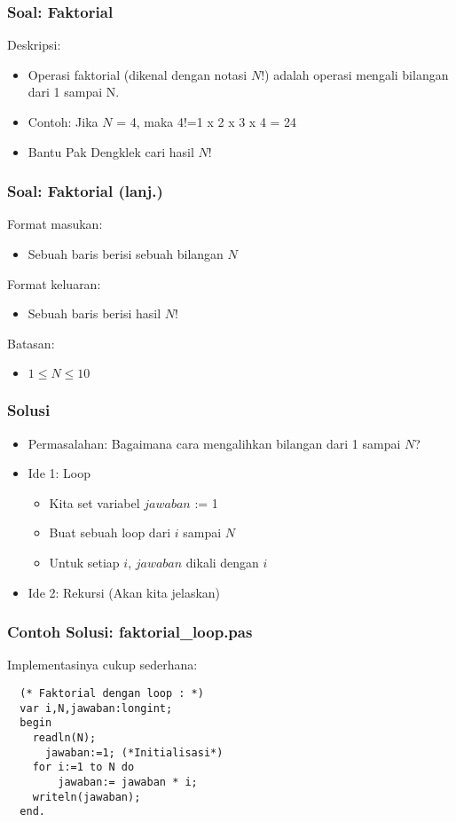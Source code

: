 \begin{frame}
\frametitle{Soal: Faktorial}
Deskripsi:
\begin{itemize}
  \item Operasi faktorial (dikenal dengan notasi $N$!) adalah operasi mengali bilangan dari 1 sampai N.
  \item Contoh: Jika $N$ = 4, maka 4!=1 x 2 x 3 x 4 = 24
  \item Bantu Pak Dengklek cari hasil $N$!
\end{itemize}
\end{frame}

\begin{frame}
\frametitle{Soal: Faktorial (lanj.) }
Format masukan:
\begin{itemize}
  \item Sebuah baris berisi sebuah bilangan $N$
\end{itemize}
Format keluaran:
\begin{itemize}
  \item Sebuah baris berisi hasil $N$!
\end{itemize}
Batasan:
\begin{itemize}
  \item $1 \le N \le 10$
\end{itemize}
\end{frame}

\begin{frame}
\frametitle{Solusi}
\begin{itemize}
  \item Permasalahan: Bagaimana cara mengalihkan bilangan dari 1 sampai $N$?
  \item Ide 1: Loop
  \begin{itemize}
    \item Kita set variabel $jawaban$ := 1
    \item Buat sebuah loop dari $i$ sampai $N$
    \item Untuk setiap $i$, $jawaban$ dikali dengan $i$
   \end{itemize}
   \item Ide 2: Rekursi (Akan kita jelaskan)
\end{itemize}
\end{frame}

\begin{frame}[fragile]
\frametitle{Contoh Solusi: faktorial\_loop.pas}
Implementasinya cukup sederhana:
\begin{lstlisting}
  (* Faktorial dengan loop : *)
  var i,N,jawaban:longint;
  begin
    readln(N);
      jawaban:=1; (*Initialisasi*)
    for i:=1 to N do
        jawaban:= jawaban * i;
    writeln(jawaban);
  end.
\end{lstlisting}
\end{frame}

